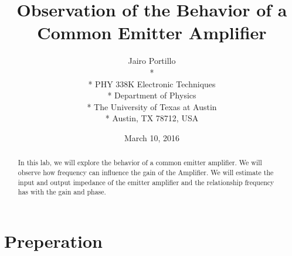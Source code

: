 \documentclass[11pt,letterpaper,onecolumn]{article}
\begin{document}

\title{\bf Observation of the Behavior of a Common Emitter Amplifier}

\author{
 Jairo Portillo \\*
  \\*
 PHY 338K Electronic Techniques \\*
 Department of Physics \\*
 The University of Texas at Austin \\*
 Austin, TX 78712, USA
}
\date{March 10, 2016}


\maketitle


\begin{abstract}

In this lab, we will explore the behavior of a common emitter amplifier. We will observe how frequency can influence the gain of the Amplifier. We will estimate the input and output impedance of the emitter amplifier and the relationship frequency has with the gain and phase.   

\end{abstract}



\section{Preperation}
\end{document}
